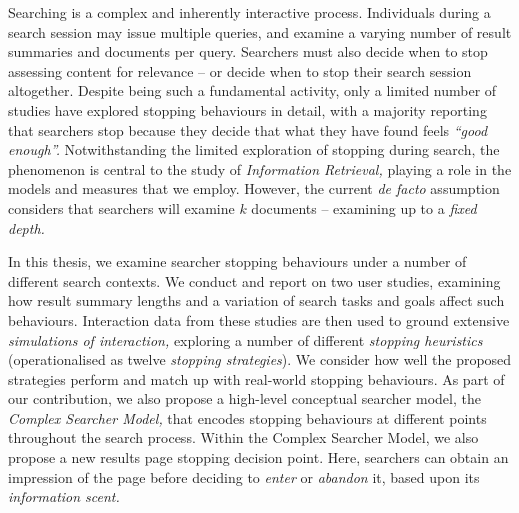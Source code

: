 
\begin{preamble}
{}

Searching is a complex and inherently interactive process. Individuals during a search session may issue multiple queries, and examine a varying number of result summaries and documents per query. Searchers must also decide when to stop assessing content for relevance -- or decide when to stop their search session altogether. Despite being such a fundamental activity, only a limited number of studies have explored stopping behaviours in detail, with a majority reporting that searchers stop because they decide that what they have found feels \emph{``good enough''.} Notwithstanding the limited exploration of stopping during search, the phenomenon is central to the study of \emph{Information Retrieval,} playing a role in the models and measures that we employ. However, the current \emph{de facto} assumption considers that searchers will examine $k$ documents -- examining up to a \emph{fixed depth.}

In this thesis, we examine searcher stopping behaviours under a number of different search contexts. We conduct and report on two user studies, examining how result summary lengths and a variation of search tasks and goals affect such behaviours. Interaction data from these studies are then used to ground extensive \emph{simulations of interaction,}  exploring a number of different \emph{stopping heuristics} (operationalised as twelve \emph{stopping strategies}). We consider how well the proposed strategies perform and match up with real-world stopping behaviours. As part of our contribution, we also propose a high-level conceptual searcher model, the \emph{Complex Searcher Model,} that encodes stopping behaviours at different points throughout the search process. Within the Complex Searcher Model, we also propose a new results page stopping decision point. Here, searchers can obtain an impression of the page before deciding to \emph{enter} or \emph{abandon} it, based upon its \emph{information scent.}


\end{preamble}

